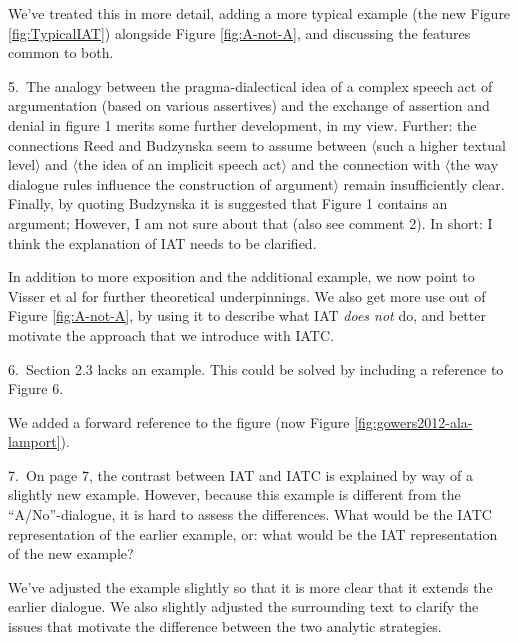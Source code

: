 We've treated this in more detail, adding a more typical example (the
new Figure \ref{fig:TypicalIAT}) alongside Figure \ref{fig:A-not-A},
and discussing the features common to both.

\begin{mdframed}[backgroundcolor=orange!10]
5.~The analogy between the pragma-dialectical idea of a complex speech act of argumentation (based on various assertives) and the exchange of assertion and denial in figure 1 merits some further development, in my view. Further: the connections Reed and Budzynska seem to assume between $\langle$such a higher textual level$\rangle$ and $\langle$the idea of an implicit speech act$\rangle$ and the connection with $\langle$the way dialogue rules influence the construction of argument$\rangle$ remain insufficiently clear. Finally, by quoting Budzynska it is suggested that Figure 1 contains an argument; However, I am not sure about that (also see comment 2). In short: I think the explanation of IAT needs to be clarified.
\end{mdframed}

In addition to more exposition and the additional example, we now
point to Visser et al \citeyearpar{visser2011correspondence} for
further theoretical underpinnings.  We also get more use out of Figure
\ref{fig:A-not-A}, by using it to describe what IAT \emph{does not}
do, and better motivate the approach that we introduce with IATC.

\begin{mdframed}[backgroundcolor=orange!10]
6.~Section 2.3 lacks an example. This could be solved by including a reference to Figure 6.
\end{mdframed}

We added a forward reference to the figure (now Figure \ref{fig:gowers2012-ala-lamport}).

\begin{mdframed}[backgroundcolor=orange!10]
7.~On page 7, the contrast between IAT and IATC is explained by way of a slightly new example. However, because this example is different from the ``A/No''-dialogue, it is hard to assess the differences. What would be the IATC representation of the earlier example, or: what would be the IAT representation of the new example?
\end{mdframed}

We've adjusted the example slightly so that it is more clear that it extends the earlier dialogue.  We also slightly adjusted the surrounding text to clarify
the issues that motivate the difference between the two analytic strategies.

